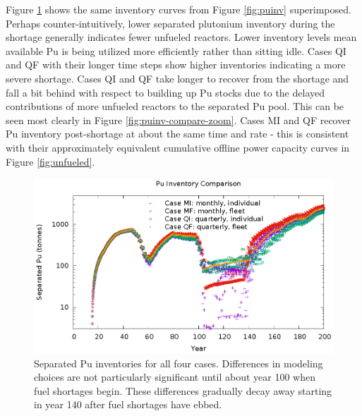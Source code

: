 \documentclass{style}
\begin{document}
Figure \ref{fig:puinv-compare} shows the same inventory curves from Figure
\ref{fig:puinv} superimposed. Perhaps counter-intuitively, lower separated
plutonium inventory during the shortage generally indicates fewer unfueled
reactors.  Lower inventory levels mean available Pu is being utilized more
efficiently rather than sitting idle.  Cases QI and QF with their longer time
steps show higher inventories indicating a more severe shortage.  Cases QI and
QF take longer to recover from the shortage and fall a bit behind with respect
to building up Pu stocks due to the delayed contributions of more unfueled
reactors to the separated Pu pool.  This can be seen most clearly in Figure
\ref{fig:puinv-compare-zoom}.  Cases MI and QF recover Pu inventory
post-shortage at about the same time and rate - this is consistent with their
approximately equivalent cumulative offline power capacity curves in Figure
\ref{fig:unfueled}.

\begin{figure}[!h]
    \centering
    \includegraphics[width=1.0\textwidth]{exp2/puinv-compare.eps}
    \caption{
        Separated Pu inventories for all four cases.  Differences in modeling
        choices are not particularly significant until about year 100 when
        fuel shortages begin.  These differences gradually decay away starting
        in year 140 after fuel shortages have ebbed.
    }
    \label{fig:puinv-compare}
\end{figure}
\end{document}
